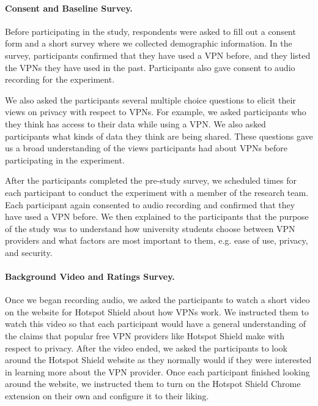 \paragraph{Consent and Baseline Survey.}
Before participating in the study, respondents were asked to fill out a
consent form and a short survey where we collected demographic information.
In the survey, participants confirmed that they have used a VPN before, and
they listed the VPNs they have used in the past.  Participants also gave
consent to audio recording for the experiment.

We also asked the participants several multiple choice questions to elicit
their views on privacy with respect to VPNs.  For example, we asked
participants who they think has access to their data while using a VPN.  We
also asked participants what kinds of data they think are being shared.  These
questions gave us a broad understanding of the views participants had about
VPNs before participating in the experiment.

After the participants completed the pre-study survey, we scheduled times for
each participant to conduct the experiment with a member of the research team.
Each participant again consented to audio recording and confirmed that they
have used a VPN before.  We then explained to the participants that the
purpose of the study was to understand how university students choose between
VPN providers and what factors are most important to them, e.g. ease of use,
privacy, and security.

\paragraph{Background Video and Ratings Survey.}
Once we began recording audio, we asked the participants to watch a short
video on the website for Hotspot Shield about how VPNs work.  We instructed
them to watch this video so that each participant would have a general
understanding of the claims that popular free VPN providers like Hotspot
Shield make with respect to privacy.  After the video ended, we asked the
participants to look around the Hotspot Shield website as they normally would
if they were interested in learning more about the VPN provider.  Once each
participant finished looking around the website, we instructed them to turn on
the Hotspot Shield Chrome extension on their own and configure it to their
liking.

